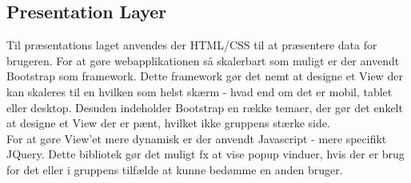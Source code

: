  \subsection{Presentation Layer}
 Til præsentations laget anvendes der HTML/CSS til at præsentere data for brugeren. For at gøre webapplikationen så skalerbart som muligt er der anvendt Bootstrap som framework. Dette framework gør det nemt at designe et View der kan skaleres til en hvilken som helst skærm - hvad end om det er mobil, tablet eller desktop. Desuden indeholder Bootstrap en række temaer, der gør det enkelt at designe et View der er pænt, hvilket ikke gruppens stærke side. \\
 For at gøre View'et mere dynamisk er der anvendt Javascript - mere specifikt JQuery. Dette bibliotek gør det muligt fx at vise popup vinduer, hvis der er brug for det eller i gruppens tilfælde at kunne bedømme en anden bruger.